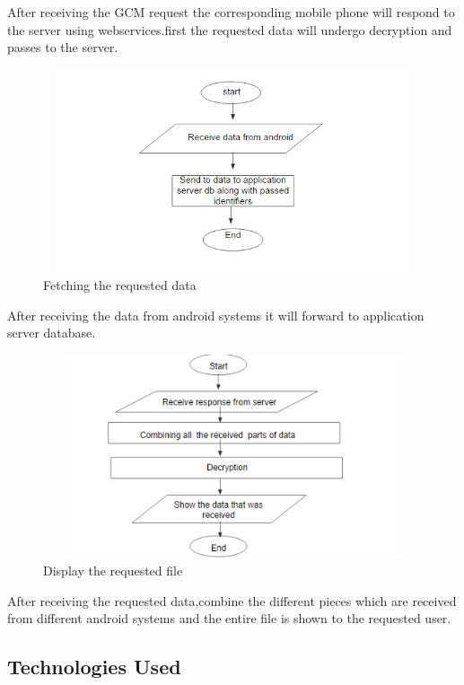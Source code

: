 \documentclass[12pt, a4paper]{article}
\begin{document}
After receiving the GCM request the corresponding mobile phone will respond to the server using webservices.first the requested data will undergo decryption and passes to the server.
\begin{center}
\begin{figure}[ht!]
    \centering
  \includegraphics[width=15cm,height=6cm,keepaspectratio]{mdsnew4.png}
     \caption{Fetching the requested data}
    \label{fig:Fetching the requested data}
\end{figure}
\end{center}
After receiving the data from android systems it will forward to application server database.
\begin{center}
\begin{figure}[ht!]
    \centering
    \includegraphics[width=15cm,height=6cm,keepaspectratio]{mdsnew5.png}
     \caption{Display the requested file}
    \label{fig:Display the requested file}
\end{figure}
\end{center}
After receiving the requested data,combine the different pieces which are received from different android systems and the entire file is shown to the requested user.

\newpage
\subsection{Technologies Used}\vspace{5mm}
\end{document}
